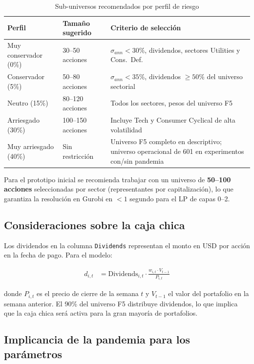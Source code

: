 \begin{table}[H]
  \centering
  \caption{Sub-universos recomendados por perfil de riesgo}
  \label{tab:subuniverse}
  \begin{tabular}{llp{6.5cm}}
    \toprule
    \textbf{Perfil} & \textbf{Tamaño sugerido} & \textbf{Criterio de selección} \\
    \midrule
    Muy conservador (0\%)  & 30--50 acciones   & $\sigma_{ann} < 30\%$, dividendos, sectores Utilities y Cons.\ Def. \\
    Conservador (5\%)      & 50--80 acciones   & $\sigma_{ann} < 35\%$, dividendos $\geq 50\%$ del universo sectorial \\
    Neutro (15\%)          & 80--120 acciones  & Todos los sectores, pesos del universo F5 \\
    Arriesgado (30\%)      & 100--150 acciones & Incluye Tech y Consumer Cyclical de alta volatilidad \\
    Muy arriesgado (40\%)  & Sin restricción   & Universo F5 completo en descriptivo; universo operacional de 601 en experimentos con/sin pandemia \\
    \bottomrule
  \end{tabular}
\end{table}

Para el prototipo inicial se recomienda trabajar con un universo de
\textbf{50--100 acciones} seleccionadas por sector (representantes por
capitalización), lo que garantiza la resolución en Gurobi en $< 1$
segundo para el LP de capas 0--2.

\subsection*{Consideraciones sobre la caja chica}

Los dividendos en la columna \texttt{Dividends} representan el monto
en USD por acción en la fecha de pago. Para el modelo:

\begin{align}
  d_{i,t} &= \text{Dividends}_{i,t} \cdot \frac{w_{i,t} \cdot V_{t-1}}{P_{i,t}}
\end{align}

donde $P_{i,t}$ es el precio de cierre de la semana $t$ y $V_{t-1}$
el valor del portafolio en la semana anterior. El 90\% del universo F5
distribuye dividendos, lo que implica que la caja chica será activa
para la gran mayoría de portafolios.

\subsection*{Implicancia de la pandemia para los parámetros}

